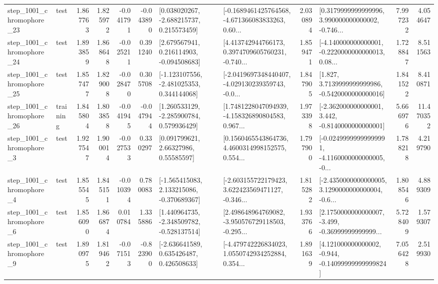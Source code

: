 \begin{tabular}{llrrrrllrlrr}
 step\_1001\_chromophore\_23 &      test &      1.867763 &    1.825972 &     -0.041791 & -0.043890 &    [0.038020267, -2.688215737, 0.215573459] &  [-0.1689461425764568, -4.671366083833263, 0.60... &       2.030894 &  [0.3179999999999996, 3.990000000000002, -0.746... &            7.997232 &          4.054647 \\
 step\_1001\_chromophore\_24 &      test &      1.893859 &    1.868648 &     -0.025211 &  0.391240 &    [2.679567941, 0.216114903, -0.094508683] &  [4.413742944766173, 0.3974709605760231, -0.740... &       1.859471 &  [-4.140000000000001, -0.2220000000000013, 0.08... &            1.728847 &          8.511563 \\
 step\_1001\_chromophore\_25 &      test &      1.857477 &    1.829008 &     -0.028470 &  0.305708 &   [-1.123107556, -2.481025353, 0.344144068] &  [-2.0419697348440407, -4.029130239359743, -0.0... &       1.847905 &   [1.827, 3.7139999999999986, -0.5420000000000016] &            1.841522 &          8.410871 \\
 step\_1001\_chromophore\_26 &  training &      1.845804 &    1.803858 &     -0.041945 & -0.047944 &    [1.260533129, -2.285900784, 0.579936429] &  [1.7481228047094939, -4.158326890804583, 0.967... &       1.973398 &   [-2.362000000000001, 3.442, -0.8140000000000001] &            5.666976 &         11.470352 \\
  step\_1001\_chromophore\_3 &      test &      1.927547 &    1.900014 &     -0.027533 &  0.330297 &       [0.091799621, 2.66327986, 0.55585597] &  [0.1560465543864736, 4.4600314998152575, 0.554... &       1.797900 &  [-0.02499999999999991, -4.1160000000000005, -0... &            1.788218 &          4.219790 \\
  step\_1001\_chromophore\_4 &      test &      1.855545 &    1.845151 &     -0.010394 &  0.780083 &   [-1.565415083, 2.133215086, -0.370689367] &  [-2.603155722179423, 3.622423569471127, -0.346... &       1.815282 &  [-2.4350000000000005, 3.1290000000000004, -0.6... &            1.808546 &          4.889309 \\
  step\_1001\_chromophore\_6 &      test &      1.856090 &    1.866874 &      0.010784 &  1.335886 &   [1.440964735, -2.348509782, -0.528137514] &  [2.498648964769082, -3.950576729118503, -0.295... &       1.933766 &  [2.1750000000000007, -3.499, -0.36999999999999... &            5.728409 &          1.579307 \\
  step\_1001\_chromophore\_9 &      test &      1.890975 &    1.819462 &     -0.071513 & -0.823900 &    [-2.636641589, 0.635426487, 0.426508633] &  [-4.479742226834023, 1.0550742934252884, 0.354... &       1.891639 &  [4.121000000000002, -0.944, -0.14099999999999824] &            7.056428 &          2.519930 \\

\end{tabular}
